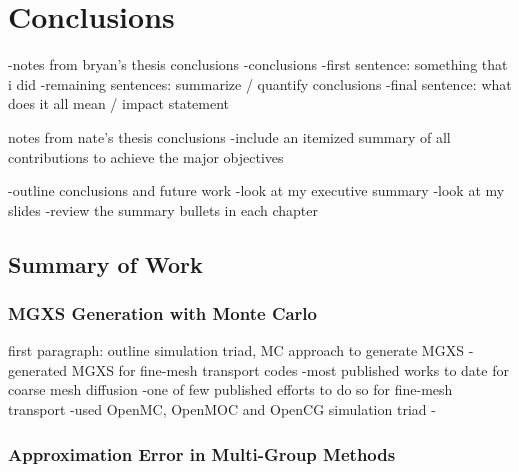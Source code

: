 \chapter{Conclusions}
\label{chap:conclusions-future-work}

-notes from bryan's thesis conclusions
  -conclusions
    -first sentence: something that i did
    -remaining sentences: summarize / quantify conclusions
    -final sentence: what does it all mean / impact statement

notes from nate's thesis conclusions
  -include an itemized summary of all contributions to achieve the major objectives

-outline conclusions and future work
  -look at my executive summary
  -look at my slides
  -review the summary bullets in each chapter

\section{Summary of Work}
\label{sec:chap12-conclusions}

\subsection{MGXS Generation with Monte Carlo}
\label{subsec:chap12-approx-error}

first paragraph: outline simulation triad, \ac{MC} approach to generate \ac{MGXS}
-generated \ac{MGXS} for fine-mesh transport codes
  -most published works to date for coarse mesh diffusion
  -one of few published efforts to do so for fine-mesh transport
-used OpenMC, OpenMOC and OpenCG simulation triad
-

\subsection{Approximation Error in Multi-Group Methods}
\label{subsec:chap12-approx-error}

